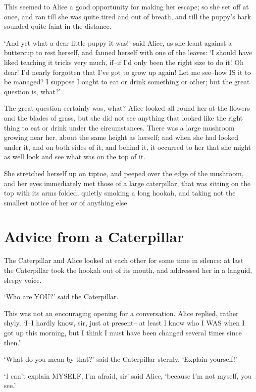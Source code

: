 \documentclass[12pt]{book}
\begin{document}
  This seemed to Alice a good opportunity for making her escape;
so she set off at once, and ran till she was quite tired and out
of breath, and till the puppy's bark sounded quite faint in the
distance.

  `And yet what a dear little puppy it was!' said Alice, as she
leant against a buttercup to rest herself, and fanned herself
with one of the leaves:  `I should have liked teaching it tricks
very much, if--if I'd only been the right size to do it!  Oh
dear!  I'd nearly forgotten that I've got to grow up again!  Let
me see--how IS it to be managed?  I suppose I ought to eat or
drink something or other; but the great question is, what?'

  The great question certainly was, what?  Alice looked all round
her at the flowers and the blades of grass, but she did not see
anything that looked like the right thing to eat or drink under
the circumstances.  There was a large mushroom growing near her,
about the same height as herself; and when she had looked under
it, and on both sides of it, and behind it, it occurred to her
that she might as well look and see what was on the top of it.

  She stretched herself up on tiptoe, and peeped over the edge of
the mushroom, and her eyes immediately met those of a large
caterpillar, that was sitting on the top with its arms folded,
quietly smoking a long hookah, and taking not the smallest notice
of her or of anything else.

\chapter{Advice from a Caterpillar}

  The Caterpillar and Alice looked at each other for some time in
silence:  at last the Caterpillar took the hookah out of its
mouth, and addressed her in a languid, sleepy voice.

  `Who are YOU?' said the Caterpillar.

  This was not an encouraging opening for a conversation.  Alice
replied, rather shyly, `I--I hardly know, sir, just at present--
at least I know who I WAS when I got up this morning, but I think
I must have been changed several times since then.'

  `What do you mean by that?' said the Caterpillar sternly.
`Explain yourself!'

  `I can't explain MYSELF, I'm afraid, sir' said Alice, `because
I'm not myself, you see.'
\end{document}
